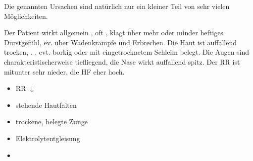 Die genannten Ursachen sind natürlich nur ein kleiner Teil von sehr vielen
Möglichkeiten.

{
Der Patient wirkt allgemein ,
oft , klagt über mehr oder minder heftiges
Durstgefühl, ev. über Wadenkrämpfe und Erbrechen. Die Haut
ist auffallend trocken, . ,
evt. borkig oder mit eingetrocknetem Schleim belegt. Die Augen sind charakteristischerweise tiefliegend, die Nase wirkt auffallend spitz. Der RR ist mitunter sehr nieder,
die HF eher hoch. 
}{
\begin{itemize}
    \item RR ${\downarrow}$
    \item stehende Hautfalten
    \item trockene, belegte Zunge
    \item Elektrolytentgleisung
    \item {}
\end{itemize}
}{}{}{}


